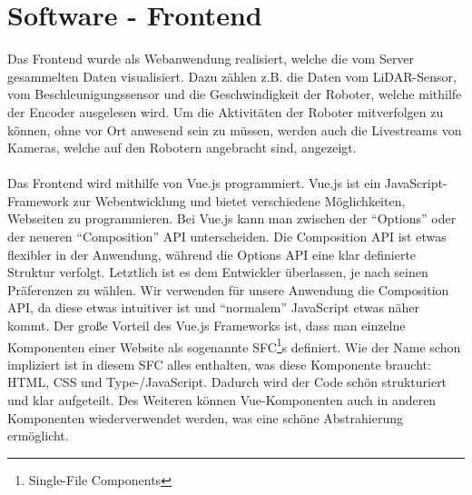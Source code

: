 
\chapter{Software - Frontend}
\label{sec:software_frontend}
Das Frontend wurde als Webanwendung realisiert,
welche die vom Server gesammelten Daten visualisiert.
%
Dazu zählen z.B. die Daten vom LiDAR-Sensor,
vom Beschleunigungssensor
und die Geschwindigkeit der Roboter,
welche mithilfe der Encoder ausgelesen wird.
%
Um die Aktivitäten der Roboter mitverfolgen zu können,
ohne vor Ort anwesend sein zu müssen,
werden auch die Livestreams von Kameras,
welche auf den Robotern angebracht sind,
angezeigt.
\\\\
Das Frontend wird mithilfe von Vue.js programmiert.
%
Vue.js ist ein JavaScript-Framework zur Webentwicklung
und bietet verschiedene Möglichkeiten,
Webseiten zu programmieren.
%
Bei Vue.js kann man zwischen der ``Options'' oder
der neueren ``Composition'' API unterscheiden.
%
Die Composition API ist etwas flexibler in der Anwendung,
während die Options API eine klar definierte Struktur verfolgt.
%
Letztlich ist es dem Entwickler überlassen,
je nach seinen Präferenzen zu wählen.
%
Wir verwenden für unsere Anwendung die Composition API,
da diese etwas intuitiver ist
und ``normalem'' JavaScript etwas näher kommt. 
%
Der große Vorteil des Vue.js Frameworks ist,
dass man einzelne Komponenten einer Website
als sogenannte SFC\footnote{Single-File Components}s definiert.
%
Wie der Name schon impliziert ist in diesem SFC alles enthalten,
was diese Komponente braucht: HTML, CSS und Type-/JavaScript.
%
Dadurch wird der Code schön strukturiert und klar aufgeteilt.
%
Des Weiteren können Vue-Komponenten auch
in anderen Komponenten wiederverwendet werden,
was eine schöne Abstrahierung ermöglicht.


